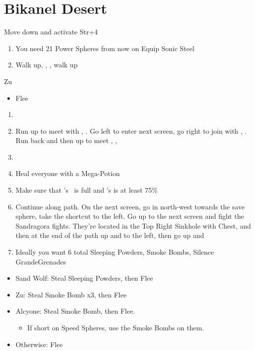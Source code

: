 \chapter{Bikanel Desert}
\begin{spheregrid}
\begin{itemize}
	\tidusf Move down and activate Str+4
\end{itemize}
\end{spheregrid}
\begin{enumerate}
	\item You need 21 Power Spheres from now on
	\tidusf Equip Sonic Steel
	\item Walk up, \sd, \save, walk up
\end{enumerate}
\begin{battle}{Zu}
\begin{itemize}
	\tidusf Defend
	\tidusf Attack
	\tidusf Defend until all party members arrive
	\item Flee
\end{itemize}
\end{battle}
\begin{enumerate}[resume]
	\item \sd
	\item Run up to meet with \wakka, \sd. Go left to enter next screen, go right to join with \kimahri, \sd. Run back and then up to meet \rikku, \sd, \save
	\item \formation{\tidus}{\kimahri}{\auron}
	\item Heal everyone with a Mega-Potion
	\item Make sure that \rikku's \od\ is full and \tidus's is at least 75\%
	\item Continue along path. On the next screen, go in north-west towards the save sphere, take the shortcut to the left. Go up to the next screen and fight the Sandragora fights. They're located in the Top Right Sinkhole with Chest, and then at the end of the path up and to the left, then go up and \sd
	\item Ideally you want 6 total Sleeping Powders, Smoke Bombs, Silence GrandeGrenades
\end{enumerate}
\begin{encounters}
\begin{itemize}
	\item Sand Wolf: Steal Sleeping Powders, then Flee
	\item Zu: Steal Smoke Bomb x3, then Flee
	\item Alcyone: Steal Smoke Bomb, then Flee.
	\begin{itemize}
		\item If short on Speed Spheres, use the Smoke Bombs on them.
	\end{itemize}
	\item Otherwise: Flee
\end{itemize}
\end{encounters}

